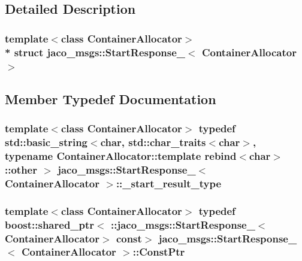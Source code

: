 \subsection{Detailed Description}
\subsubsection*{template$<$class Container\+Allocator$>$\\*
struct jaco\+\_\+msgs\+::\+Start\+Response\+\_\+$<$ Container\+Allocator $>$}



\subsection{Member Typedef Documentation}
\subsubsection[{\texorpdfstring{\+\_\+start\+\_\+result\+\_\+type}{_start_result_type}}]{\setlength{\rightskip}{0pt plus 5cm}template$<$class Container\+Allocator$>$ typedef std\+::basic\+\_\+string$<$char, std\+::char\+\_\+traits$<$char$>$, typename Container\+Allocator\+::template rebind$<$char$>$\+::other $>$ {\bf jaco\+\_\+msgs\+::\+Start\+Response\+\_\+}$<$ Container\+Allocator $>$\+::{\bf \+\_\+start\+\_\+result\+\_\+type}}\hypertarget{structjaco__msgs_1_1StartResponse___a0aea3a55e33359c555d94d894579ea99}{}\label{structjaco__msgs_1_1StartResponse___a0aea3a55e33359c555d94d894579ea99}
\subsubsection[{\texorpdfstring{Const\+Ptr}{ConstPtr}}]{\setlength{\rightskip}{0pt plus 5cm}template$<$class Container\+Allocator$>$ typedef boost\+::shared\+\_\+ptr$<$ \+::{\bf jaco\+\_\+msgs\+::\+Start\+Response\+\_\+}$<$Container\+Allocator$>$ const$>$ {\bf jaco\+\_\+msgs\+::\+Start\+Response\+\_\+}$<$ Container\+Allocator $>$\+::{\bf Const\+Ptr}}\hypertarget{structjaco__msgs_1_1StartResponse___a2ad4ef5f394857ba9b607c778511026a}{}\label{structjaco__msgs_1_1StartResponse___a2ad4ef5f394857ba9b607c778511026a}
